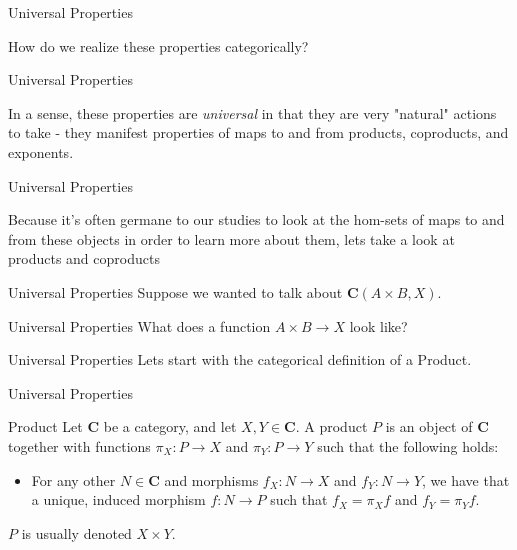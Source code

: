 \documentclass[tikz]{beamer}
\theoremstyle{definition}
\begin{document}
\begin{frame}{Universal Properties}

How do we realize these properties categorically? 

\end{frame}

\begin{frame}{Universal Properties}

In a sense, these properties are \textit{universal} in that they are very "natural" actions to take - they manifest properties of maps to and from products, coproducts, and exponents.

\end{frame}

\begin{frame}{Universal Properties}

Because it's often germane to our studies to look at the hom-sets of maps to and from these objects in order to learn more about them, lets take a look at products and coproducts

\end{frame}

\begin{frame}{Universal Properties}
    Suppose we wanted to talk about $\mathbf{C}(A \times B, X)$. 
\end{frame}

\begin{frame}{Universal Properties}
    What does a function $A \times B \to X$ look like? 
\end{frame}{}

\begin{frame}{Universal Properties}
    Lets start with the categorical definition of a Product.
\end{frame}

\begin{frame}{Universal Properties}
    \begin{definition}{Product}
        Let $\mathbf{C}$ be a category, and let $X, Y \in \mathbf{C}$. A product $P$ is an object of $\mathbf{C}$ together with functions $\pi_X: P \to X$ and $\pi_Y: P \to Y$ such that the following holds:  
            \begin{itemize}
                \item For any other $N \in \mathbf{C}$ and morphisms $f_X: N \to X$ and $f_Y : N \to Y$, we have that a unique, induced morphism $f : N \to P$ such that $f_X = \pi_Xf$ and $f_Y = \pi_Yf$. 
            \end{itemize}
    \end{definition}
    $P$ is usually denoted $X \times Y$.
\end{frame}{}
\end{document}
